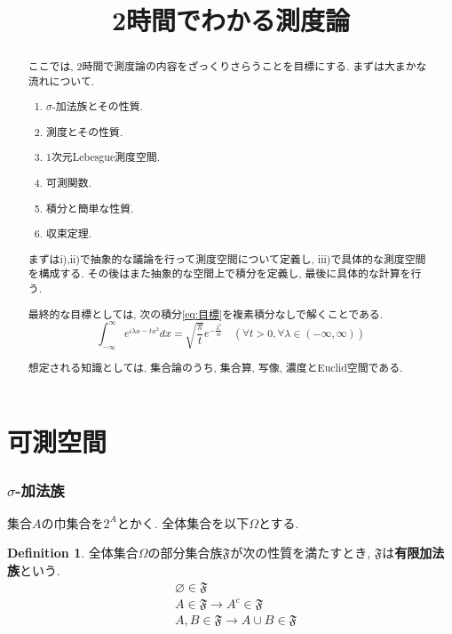 \documentclass[a4j,dvipdfmx]{jsarticle}
\title{2時間でわかる測度論}
\newcommand{\F}{\mathfrak{F}}
\theoremstyle{definition}
\newtheorem{definition}{Definition}[section]
\theoremstyle{definition}
\numberwithin{equation}{section}
\begin{document}
    \maketitle

    \begin{abstract}
        ここでは, 2時間で測度論の内容をざっくりさらうことを目標にする. まずは大まかな流れについて.

        \begin{enumerate}\renewcommand{\labelenumi}{\roman{enumi})}
            \item $\sigma$-加法族とその性質.
            \item 測度とその性質.
            \item 1次元Lebesgue測度空間.
            \item 可測関数.
            \item 積分と簡単な性質.
            \item 収束定理.
        \end{enumerate}

        まずはi),ii)で抽象的な議論を行って測度空間について定義し, iii)で具体的な測度空間を構成する. その後はまた抽象的な空間上で積分を定義し, 
        最後に具体的な計算を行う.

        最終的な目標としては, 次の積分\eqref{eq:目標}を複素積分なしで解くことである.
        \begin{equation}
            \int_{-\infty}^{\infty}e^{i\lambda x-tx^2}dx=\sqrt{\frac{\pi}{t}}e^{-\frac{\lambda^2}{4t}}\quad (\forall t>0, \forall \lambda\in(-\infty,\infty)) \label{eq:目標}
        \end{equation}

        想定される知識としては, 集合論のうち, 集合算, 写像, 濃度とEuclid空間である.
    \end{abstract}
    
    \clearpage
    \tableofcontents
    \clearpage

    \part{可測空間}
        \section{$\sigma$-加法族}
            集合$A$の巾集合を$2^A$とかく. 全体集合を以下$\Omega$とする. 

            \begin{definition}
                全体集合$\Omega$の部分集合族$\F$が次の性質を満たすとき, $\F$は\textbf{有限加法族}という.
                \begin{align}
                    &\varnothing \in \F \label{eq:有限加法族性質1} \\
                    &A \in \F \rightarrow A^c \in \F \label{eq:有限加法族性質2} \\
                    &A,B \in \F \rightarrow A\cup B \in \F \label{eq:有限加法族性質3}
                \end{align}
            \end{definition}
\end{document}
